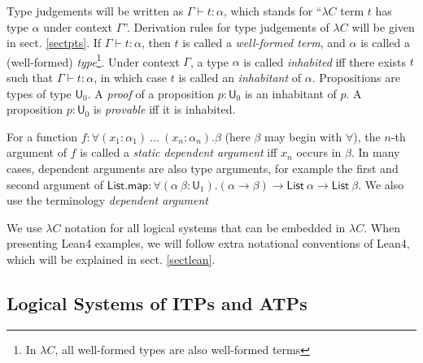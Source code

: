   Type judgements will be written as $\Gamma \vdash t : \alpha$, which stands for ``$\lambda C$ term $t$
  has type $\alpha$ under context $\Gamma$''. Derivation rules for type judgements of
  $\lambda C$ will be given in sect. \ref{sectpts}. If $\Gamma \vdash t : \alpha$, then $t$ is
  called a \textit{well-formed term}, and $\alpha$ is called a (well-formed)
  \textit{type}\footnote{In $\lambda C$, all well-formed types are also well-formed terms}.
  Under context $\Gamma$, a type $\alpha$ is called \textit{inhabited} iff there exists $t$ such
  that $\Gamma \vdash t : \alpha$, in which case $t$ is called an \textit{inhabitant} of $\alpha$.
  Propositions are types of type $\mathsf{U}_0$. A \textit{proof} of a proposition
  $p : \mathsf{U}_0$ is an inhabitant of $p$. A proposition $p : \mathsf{U}_0$ is \textit{provable}
  iff it is inhabited.

  For a function $f : \forall (x_1 : \alpha_1) \ \dots \ (x_n : \alpha_n). \beta$ (here $\beta$ may begin with $\forall$),
  the $n$-th argument of $f$ is called a \textit{static dependent argument} iff $x_n$ occurs in $\beta$.
  In many cases, dependent arguments are also type arguments, for example the first and second argument
  of $\mathsf{List.map} : \forall (\alpha \ \beta : \mathsf{U}_1). (\alpha \to \beta) \to \mathsf{List} \ \alpha \to \mathsf{List} \ \beta$.
  We also use the terminology \textit{dependent argument}

  We use $\lambda C$ notation for all logical systems that can be embedded in $\lambda C$.
  When presenting Lean4 examples, we will follow extra notational conventions
  of Lean4, which will be explained in sect. \ref{sectlean}.

\subsection{Logical Systems of ITPs and ATPs}\label{sublogsys}

